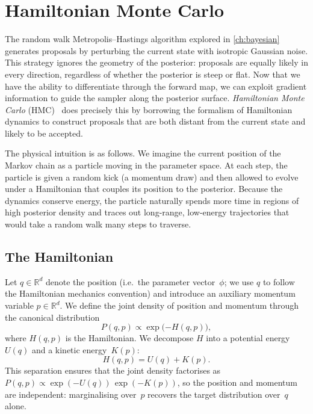 \chapter{Hamiltonian Monte Carlo}\label{ch:hmc}

The random walk Metropolis--Hastings algorithm explored in
\cref{ch:bayesian} generates proposals by perturbing the current state
with isotropic Gaussian noise. This strategy ignores the geometry of the
posterior: proposals are equally likely in every direction, regardless of
whether the posterior is steep or flat. Now that we have the ability to
differentiate through the forward map, we can exploit gradient information
to guide the sampler along the posterior surface. \emph{Hamiltonian Monte
Carlo} (HMC)~\cite{betancourt2018hamiltonian,neal2011mcmc} does precisely
this by borrowing the formalism of Hamiltonian dynamics to construct
proposals that are both distant from the current state and likely to be
accepted.

The physical intuition is as follows. We imagine the current position of
the Markov chain as a particle moving in the parameter space. At each
step, the particle is given a random kick (a momentum draw) and then
allowed to evolve under a Hamiltonian that couples its position to the
posterior. Because the dynamics conserve energy, the particle naturally
spends more time in regions of high posterior density and traces out
long-range, low-energy trajectories that would take a random walk many
steps to traverse.

\section{The Hamiltonian}\label{sec:hamiltonian}

Let $q \in \mathbb{R}^d$ denote the position (i.e.\ the parameter
vector~$\phi$; we use $q$ to follow the Hamiltonian mechanics convention) and
introduce an auxiliary momentum variable $p \in \mathbb{R}^d$. We define
the joint density of position and momentum through the canonical
distribution
\begin{equation}
  P(q, p) \propto \exp\!\big({-H(q, p)}\big),
  \label{eq:canonical-distribution}
\end{equation}
where $H(q, p)$ is the Hamiltonian. We decompose $H$ into a potential
energy~$U(q)$ and a kinetic energy~$K(p)$:
\begin{equation}
  H(q, p) = U(q) + K(p).
  \label{eq:hamiltonian-decomposition}
\end{equation}
This separation ensures that the joint density factorises as
$P(q, p) \propto \exp(-U(q))\,\exp(-K(p))$, so the position and
momentum are independent: marginalising over~$p$ recovers the target
distribution over~$q$ alone.


